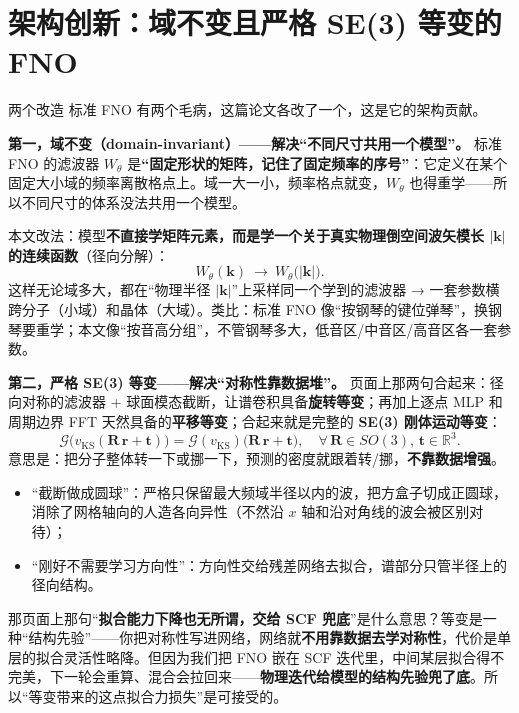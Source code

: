 \documentclass[11pt, a4paper, fontset=none]{ctexart}
\newcommand{\hl}[1]{{\color{key}\bfseries #1}}
\begin{document}
\section{架构创新：域不变且严格 SE(3) 等变的 FNO}\label{sec:s7}

\begin{say}{两个改造}
标准 FNO 有两个毛病，这篇论文各改了一个，这是它的架构贡献。

\textbf{第一，域不变（domain-invariant）——解决“不同尺寸共用一个模型”。}
标准 FNO 的滤波器 $W_\theta$ 是\hl{“固定形状的矩阵，记住了固定频率的序号”}：它定义在某个固定大小域的频率离散格点上。域一大一小，频率格点就变，$W_\theta$ 也得重学——所以不同尺寸的体系没法共用一个模型。

本文改法：模型\hl{不直接学矩阵元素，而是学一个关于真实物理倒空间波矢模长 $|\mathbf k|$ 的连续函数}（径向分解）：
\begin{equation}
W_\theta(\mathbf k)\ \longrightarrow\ W_\theta\big(|\mathbf k|\big).
\end{equation}
这样无论域多大，都在“物理半径 $|\mathbf k|$”上采样同一个学到的滤波器 → 一套参数横跨分子（小域）和晶体（大域）。类比：标准 FNO 像“按钢琴的键位弹琴”，换钢琴要重学；本文像“按音高分组”，不管钢琴多大，低音区/中音区/高音区各一套参数。

\textbf{第二，严格 SE(3) 等变——解决“对称性靠数据堆”。}
页面上那两句合起来：径向对称的滤波器 + 球面模态截断，让谱卷积具备\hl{旋转等变}；再加上逐点 MLP 和周期边界 FFT 天然具备的\hl{平移等变}；合起来就是完整的 \hl{SE(3) 刚体运动等变}：
\begin{equation}
\mathcal G\big(v_{\text{KS}}(\mathbf R\,\mathbf r+\mathbf t)\big) = \mathcal G(v_{\text{KS}})\big(\mathbf R\,\mathbf r+\mathbf t\big),\quad \forall\,\mathbf R\in SO(3),\,\mathbf t\in\mathbb R^3.
\end{equation}
意思是：把分子整体转一下或挪一下，预测的密度就跟着转/挪，\hl{不靠数据增强}。
\begin{itemize}[leftmargin=*]
  \item “截断做成圆球”：严格只保留最大频域半径以内的波，把方盒子切成正圆球，消除了网格轴向的人造各向异性（不然沿 $x$ 轴和沿对角线的波会被区别对待）；
  \item “刚好不需要学习方向性”：方向性交给残差网络去拟合，谱部分只管半径上的径向结构。
\end{itemize}

那页面上那句“\hl{拟合能力下降也无所谓，交给 SCF 兜底}”是什么意思？等变是一种“结构先验”——你把对称性写进网络，网络就\textbf{不用靠数据去学对称性}，代价是单层的拟合灵活性略降。但因为我们把 FNO 嵌在 SCF 迭代里，中间某层拟合得不完美，下一轮会重算、混合会拉回来——\hl{物理迭代给模型的结构先验兜了底}。所以“等变带来的这点拟合力损失”是可接受的。
\end{say}
\end{document}
